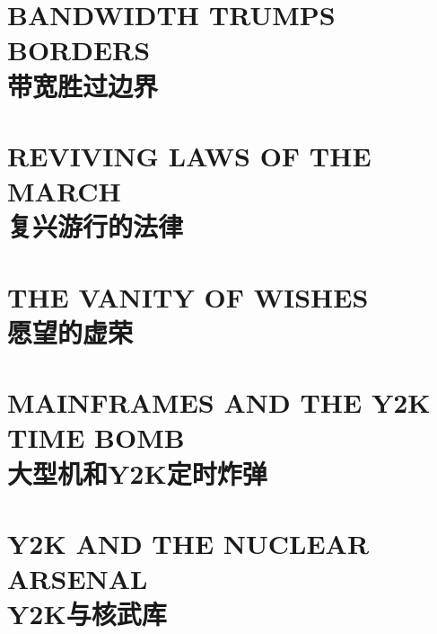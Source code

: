 \section[带宽胜过边界]{BANDWIDTH TRUMPS BORDERS\\带宽胜过边界}



\section[复兴游行的法律]{REVIVING LAWS OF THE MARCH\\复兴游行的法律}


\section[愿望的虚荣]{THE VANITY OF WISHES\\愿望的虚荣}


\section[大型机和Y2K定时炸弹]{MAINFRAMES AND THE Y2K TIME BOMB\\大型机和Y2K定时炸弹}


\section[Y2K与核武库]{Y2K AND THE NUCLEAR ARSENAL\\Y2K与核武库}



\begin{paracol}{2}[]
\switchcolumn
\end{paracol}

